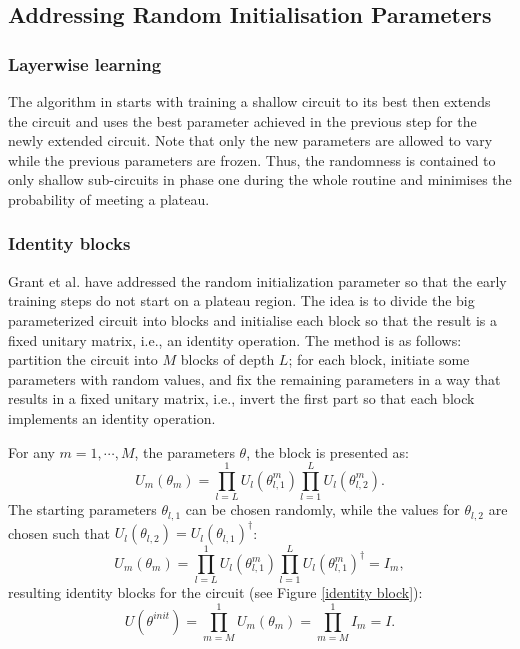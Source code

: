 \subsection{Addressing Random Initialisation Parameters}

\subsubsection{Layerwise learning}
The algorithm in \cite{skolikLayerwiseLearningQuantum2021} starts with training a shallow circuit to its best then extends the circuit and uses the best parameter achieved in the previous step for the newly extended circuit. 
Note that only the new parameters are allowed to vary while the previous parameters are frozen.
Thus, the randomness is contained to only shallow sub-circuits in phase one during the whole routine and minimises the probability of meeting a plateau.


\subsubsection{Identity blocks}

Grant et al. \cite{grantInitializationStrategyAddressing2019} have addressed the random initialization parameter so that the early training steps do not start on a plateau region. 
The idea is to divide the big parameterized circuit into blocks and initialise each block so that the result is a fixed unitary matrix, i.e., an identity operation. 
The method is as follows: partition the circuit into $M$ blocks of depth $L$; for each block, initiate some parameters with random values, and fix the remaining parameters in a way that results in a fixed unitary matrix, i.e., invert the first part so that each block implements an identity operation.

For any $m = 1, \cdots, M$, the parameters $\theta$, the block is presented as:
\begin{equation}
    U_m(\theta_m)
    = \prod_{l=L}^1 U_l(\theta_{l,1}^m) \prod_{l=1}^L U_l(\theta_{l,2}^m).
\end{equation}
The starting parameters $\theta_{l,1}$ can be chosen randomly, while the values for $\theta_{l,2}$ are chosen such that $U_l(\theta_{l,2}) = U_l(\theta_{l,1})^\dagger$:
\begin{equation}
    U_m(\theta_m)
    = \prod_{l=L}^1 U_l(\theta_{l,1}^m)
    \prod_{l=1}^L U_l(\theta_{l,1}^m)^\dagger
    = I_m,
\end{equation}
resulting identity blocks for the circuit (see Figure \ref{identity block}):
\begin{equation}
    U(\theta^{init})
    = \prod_{m=M}^1 U_m(\theta_m)
    = \prod_{m=M}^1 I_m
    = I.
\end{equation}


